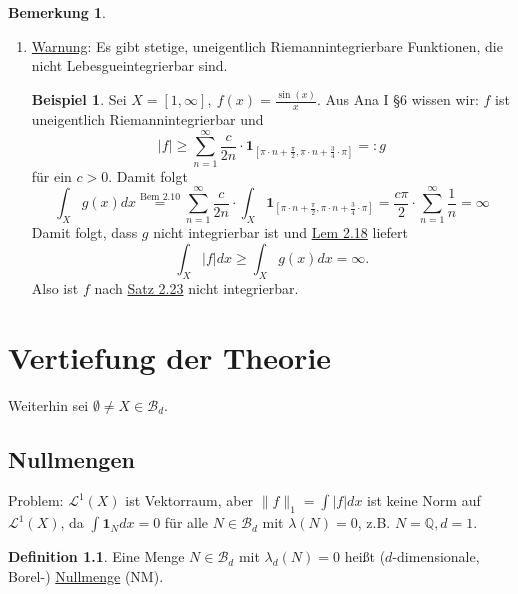 \documentclass[a4paper]{scrreprt}
\newcommand{\doubleOne}{\textbf{1}}
\newcommand{\Q}{\mathbb{Q}}
\newcommand{\Borel}{\mathcal{B}}
\newcommand{\Bd}{\Borel_d}
\newcommand{\Leb}{\mathcal{L}}
\newcommand{\jlabel}[1]{\label{j_#1}}
\newcommand{\jhyperref}[2]{\hyperref[j_#1]{#2}}
\newcommand{\jlink}[1]{\jhyperref{#1}{#1}}
\theoremstyle{plain}
\theoremstyle{definition}
\newtheorem{defn}[thm]{Definition}
\newtheorem{bem}[thm]{Bemerkung}
\newtheorem*{expl*}{Beispiel}
\begin{document}
{{{{\begin{bem}
\begin{enumerate}
        \item
            \uline{Warnung}: Es gibt stetige, uneigentlich Riemannintegrierbare Funktionen, die nicht Lebesgueintegrierbar sind.
            \begin{expl*}
                Sei $X=[1,\infty], \ f(x) = \frac{\sin(x)}{x}$. Aus Ana I §6 wissen wir: $f$ ist uneigentlich Riemannintegrierbar und
                \begin{displaymath}
                    |f| \ge \sum_{n=1}^\infty \frac{c}{2n} \cdot \doubleOne_{[\pi\cdot n + \frac{\pi}{2}, \pi\cdot n + \frac{3}{4}\cdot \pi]} =: g
                \end{displaymath}
                für ein $c>0$. Damit folgt
                \begin{displaymath}
                    \int_X g(x) dx \overset{\text{Bem 2.10}}{=} \sum_{n=1}^\infty \frac{c}{2n} \cdot \int_X \doubleOne_{[\pi\cdot n + \frac{\pi}{2}, \pi\cdot n + \frac{3}{4}\cdot \pi]} = \frac{c\pi}{2} \cdot \sum_{n=1}^\infty \frac{1}{n} = \infty
                \end{displaymath}
                Damit folgt, dass $g$ nicht integrierbar ist und \jlink{Lem 2.18} liefert
                \begin{displaymath}
                    \int_X|f|dx \ge \int_X g(x)dx = \infty. 
                \end{displaymath}
                Also ist $f$ nach \jlink{Satz 2.23} nicht integrierbar.
            \end{expl*}

    \end{enumerate}
\end{bem}

\chapter{Vertiefung der Theorie}
    Weiterhin sei $\emptyset \ne X \in \Bd$.
    
\section{Nullmengen}

Problem: $\Leb^1(X)$ ist Vektorraum, aber $\lVert f \rVert_1 = \int |f|dx$ ist keine Norm auf $\Leb^1(X)$, da $\int \doubleOne_N dx = 0$ für alle $N \in \Bd$ mit $\lambda(N) = 0$, z.B. $N=\Q, d=1$.

\begin{defn}
\jlabel{Def 3.1}
    Eine Menge $N\in \Bd$ mit $\lambda_d(N) = 0$ heißt ($d$-dimensionale, Borel-) \uline{Nullmenge} (NM).
\end{defn}


}}}}
\end{document}
